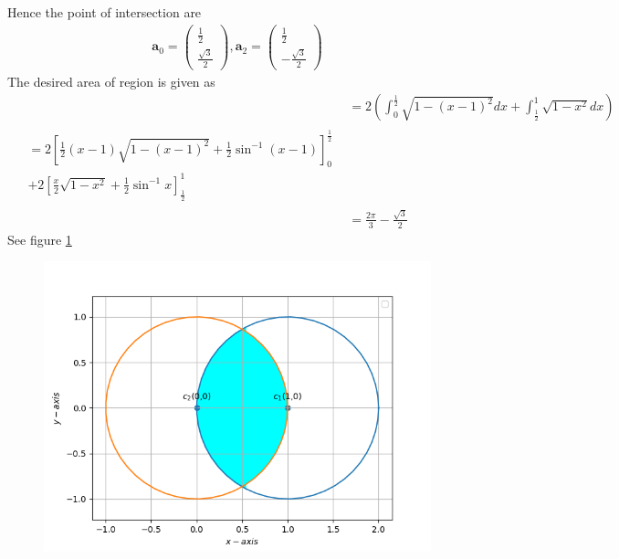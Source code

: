 \documentclass[12pt]{article}
\providecommand{\sbrak}[1]{\ensuremath{{}\left[#1\right]}}
\providecommand{\brak}[1]{\ensuremath{\left(#1\right)}}
\newcommand{\myvec}[1]{\ensuremath{\begin{pmatrix}#1\end{pmatrix}}}
\let\vec\mathbf
\begin{document}
Hence the point of intersection are
\begin{align}
	\vec{a}_0 = \myvec{\frac{1}{2}\\\frac{\sqrt{3}}{2}}, \vec{a}_2 = \myvec{\frac{1}{2}\\-\frac{\sqrt{3}}{2}}
\end{align}
The desired area of region is given as
\begin{align}
	&=2\brak{\int_{0}^{\frac{1}{2}} \sqrt{1-\brak{x-1}^2}dx + \int_{\frac{1}{2}}^{1} \sqrt{1-x^2}dx}\\
	\begin{split}
		&{}=2\sbrak{\frac{1}{2}\brak{x-1}\sqrt{1-\brak{x-1}^2}+\frac{1}{2}\sin^{-1}\brak{x-1}}_{0}^{\frac{1}{2}}\\
		& +2\sbrak{\frac{x}{2}\sqrt{1-x^2}+\frac{1}{2}\sin^{-1}x}_{\frac{1}{2}}^{1}
	\end{split}\\
	&= \frac{2\pi}{3}-\frac{\sqrt{3}}{2}
\end{align}
See figure \ref{fig:chapters/12/8/2/2/Fig1}
\begin{figure}[!h]
	\begin{center} 
	    \includegraphics[width=\columnwidth]{chapters/12/8/2/2/figs/inter1}
	\end{center}
\caption{}
\label{fig:chapters/12/8/2/2/Fig1}
\end{figure}
\end{document}
